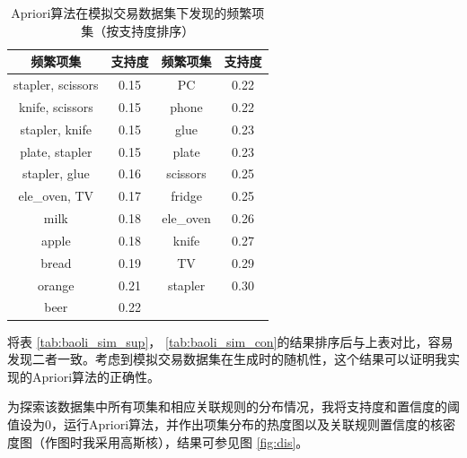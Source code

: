 \documentclass[12pt,a4paper]{article}
\theoremstyle{definition}
\begin{document}
\begin{table}[H]
	\renewcommand\arraystretch{1.35}
	\caption{Apriori算法在模拟交易数据集下发现的频繁项集（按支持度排序）}
	\label{tab:apriori_sim_sup}
	\centering
	
	\begin{tabular}{c|c|c|c}
		\centering
		频繁项集 & 支持度 & 频繁项集 & 支持度 \\
		\hline
		stapler, scissors & 0.15 & PC & 0.22 \\
		knife, scissors & 0.15 & phone & 0.22 \\
		stapler, knife & 0.15 & glue & 0.23 \\
		plate, stapler & 0.15 &plate & 0.23 \\
		stapler, glue & 0.16 & scissors & 0.25 \\
		ele\_oven, TV & 0.17 & fridge & 0.25 \\
		milk & 0.18 & ele\_oven & 0.26 \\
		apple & 0.18 & knife & 0.27 \\
		bread & 0.19 & TV & 0.29 \\
		orange & 0.21 & stapler & 0.30 \\
		beer & 0.22 & & \\		
	\end{tabular}
\end{table}

将表 \ref{tab:baoli_sim_sup}， \ref{tab:baoli_sim_con}的结果排序后与上表对比，容易发现二者一致。考虑到模拟交易数据集在生成时的随机性，这个结果可以证明我实现的Apriori算法的正确性。

为探索该数据集中所有项集和相应关联规则的分布情况，我将支持度和置信度的阈值设为0，运行Apriori算法，并作出项集分布的热度图以及关联规则置信度的核密度图（作图时我采用高斯核），结果可参见图 \ref{fig:dis}。
\end{document}
